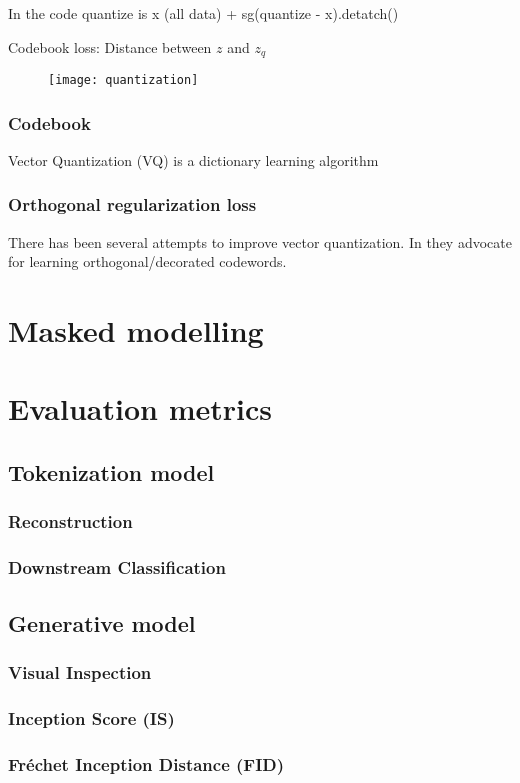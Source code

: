 \documentclass[../../thesis.tex]{subfiles}
\begin{document}
In the code quantize is x (all data) + sg(quantize - x).detatch()



Codebook loss: Distance between $z$ and $z_q$ 


\begin{figure}[h]
    \texttt{[image: quantization]}
    \centering    
\end{figure}





\subsubsection{Codebook}
Vector Quantization (VQ) is a dictionary learning algorithm 

\subsubsection{Orthogonal regularization loss}
There has been several attempts to improve vector quantization. In \cite{shin2023exploration} they advocate for learning orthogonal/decorated codewords. 



\section{Masked modelling}


\section{Evaluation metrics}

\subsection{Tokenization model}

\subsubsection{Reconstruction}

\subsubsection{Downstream Classification}




\subsection{Generative model}

\subsubsection{Visual Inspection}

\subsubsection{Inception Score (IS)}

\subsubsection{Fréchet Inception Distance (FID)}
\end{document}

